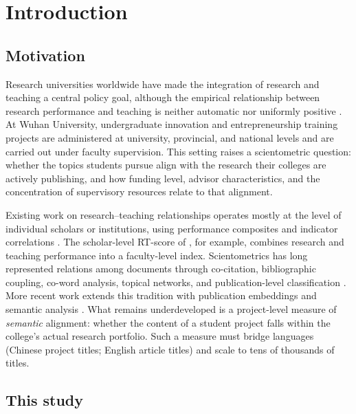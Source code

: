 \documentclass[11pt]{article}
\begin{document}
\section{Introduction}

\subsection{Motivation}

Research universities worldwide have made the integration of research and teaching a central policy goal, although the empirical relationship between research performance and teaching is neither automatic nor uniformly positive \citep{hattie1996relationship,healey2005linking,brew2003teaching,linn2015undergraduate}. At Wuhan University, undergraduate innovation and entrepreneurship training projects are administered at university, provincial, and national levels and are carried out under faculty supervision. This setting raises a scientometric question: whether the topics students pursue align with the research their colleges are actively publishing, and how funding level, advisor characteristics, and the concentration of supervisory resources relate to that alignment.

Existing work on research--teaching relationships operates mostly at the level of individual scholars or institutions, using performance composites and indicator correlations \citep{maisano2023empirical,scafetta2025rt,xiong2026nexus}. The scholar-level RT-score of \citet{scafetta2025rt}, for example, combines research and teaching performance into a faculty-level index. Scientometrics has long represented relations among documents through co-citation, bibliographic coupling, co-word analysis, topical networks, and publication-level classification \citep{small1973cocitation,boyack2010cocitation,callon1991coword,yanding2012networks,waltman2012classification}. More recent work extends this tradition with publication embeddings and semantic analysis \citep{lamers2021appraisal,huang2022interdisciplinarity,motohashi2024measuring}. What remains underdeveloped is a project-level measure of \emph{semantic} alignment: whether the content of a student project falls within the college's actual research portfolio. Such a measure must bridge languages (Chinese project titles; English article titles) and scale to tens of thousands of titles.

\subsection{This study}
\end{document}
